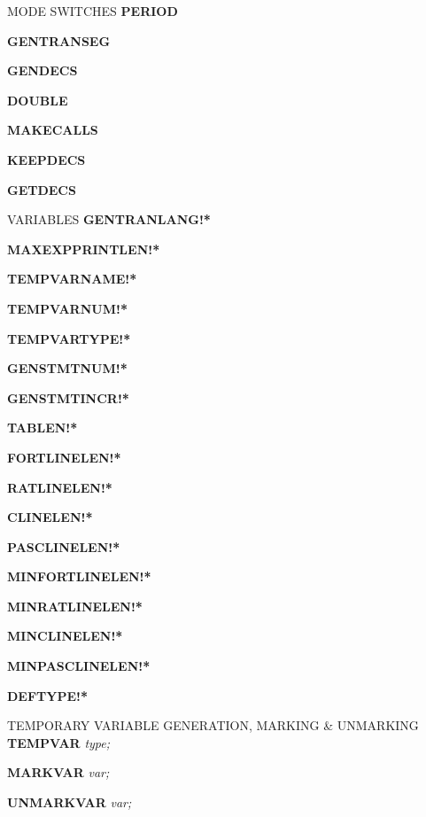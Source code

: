 \begin{describe}{MODE SWITCHES}
{\bf PERIOD} 

{\bf GENTRANSEG} 

{\bf GENDECS} 

{\bf DOUBLE} 

{\bf MAKECALLS} 

{\bf KEEPDECS} 

{\bf GETDECS} 

\end{describe}

\begin{describe}{VARIABLES}
{\bf GENTRANLANG!*}  

{\bf MAXEXPPRINTLEN!*}  

{\bf TEMPVARNAME!*}  

{\bf TEMPVARNUM!*}  

{\bf TEMPVARTYPE!*}  

{\bf GENSTMTNUM!*}  

{\bf GENSTMTINCR!*}  

{\bf TABLEN!*}  

{\bf FORTLINELEN!*}  

{\bf RATLINELEN!*}  

{\bf CLINELEN!*}  

{\bf PASCLINELEN!*}  

{\bf MINFORTLINELEN!*}  

{\bf MINRATLINELEN!*}  

{\bf MINCLINELEN!*}  

{\bf MINPASCLINELEN!*}  

{\bf DEFTYPE!*} 
\end{describe}

\begin{describe}{TEMPORARY VARIABLE GENERATION, MARKING \& UNMARKING}
{\bf TEMPVAR} {\it type;} 

{\bf MARKVAR} {\it var;} 

{\bf UNMARKVAR} {\it var;} 
\end{describe}

